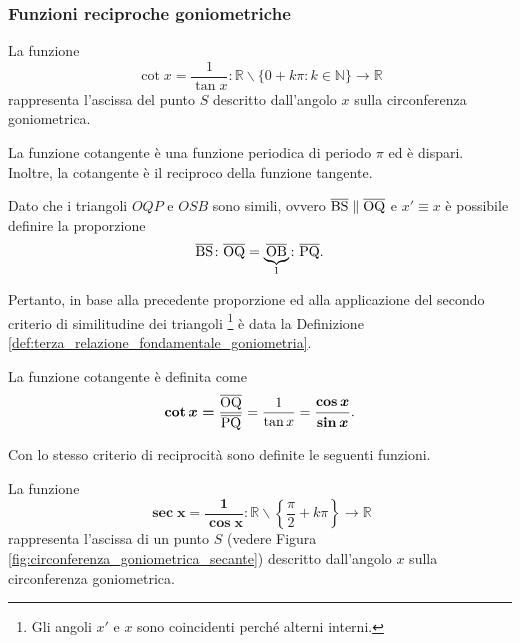 \subsubsection{Funzioni reciproche goniometriche}

\begin{definition}[Cotangente]
    La funzione
    \begin{equation*}
        \cot x = \frac{1}{\tan x}\colon\mathbb R \backslash\{0+k\pi\colon k\in\mathbb N\}\rightarrow\mathbb R
    \end{equation*}
    rappresenta l'ascissa del punto $S$ descritto dall'angolo $x$ sulla circonferenza goniometrica.
\end{definition}

\begin{property}
    La funzione cotangente è una funzione periodica di periodo $\pi$ ed è dispari. Inoltre, la cotangente è il \gls{reciproco} della funzione tangente.
\end{property}


Dato che i triangoli $OQP$ e $OSB$ sono simili, ovvero $\overline{\rm BS}\parallel\overline{\rm OQ}$ e $x'\equiv x$ è possibile definire  la proporzione
\begin{equation*}
    \overline{\rm BS}\colon\overline{\rm OQ}=\underbrace{\overline{\rm OB}}_{1}\colon\overline{\rm PQ}.
\end{equation*}

Pertanto, in base alla precedente proporzione ed alla applicazione del secondo criterio di similitudine dei triangoli \footnote{Gli angoli $x'$ e $x$ sono coincidenti perché alterni interni.} è data la Definizione \ref{def:terza_relazione_fondamentale_goniometria}.

\begin{definition}\label{def:terza_relazione_fondamentale_goniometria}
    La funzione cotangente è definita come
    \begin{equation*}
        \boldsymbol{\cot x=}\frac{\overline{\rm OQ}}{\overline{\rm PQ}}=\frac{1}{\tan x}=\boldsymbol{\frac{\cos x}{\sin x}}.
    \end{equation*}
\end{definition}

Con lo stesso criterio di reciprocità sono definite le seguenti funzioni.

\begin{definition}
    La funzione
    \begin{equation*}
        \boldsymbol{\sec x=\frac{1}{\cos x}}\colon\mathbb R\backslash\left\{\frac{\pi}{2}+k\pi\right\}\rightarrow\mathbb R
    \end{equation*}
    rappresenta l'ascissa di un punto $S$ (vedere Figura \ref{fig:circonferenza_goniometrica_secante}) descritto dall'angolo $x$ sulla circonferenza goniometrica.
\end{definition}

